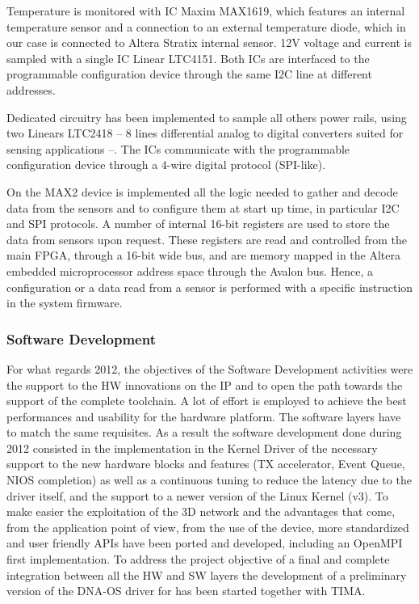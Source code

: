 Temperature is monitored with IC Maxim MAX1619, which features an
internal temperature sensor and a connection to an external temperature
diode, which in our case is connected to Altera Stratix internal sensor.
12V voltage and current is sampled with a single IC Linear LTC4151. 
Both ICs are interfaced to the programmable configuration device 
through the same I2C line at different addresses.

Dedicated circuitry has been implemented to sample all others power
rails, using two Linears LTC2418 -- 8 lines differential analog
to digital converters suited for sensing applications --. The ICs
communicate with the programmable configuration device through a
4-wire digital protocol (SPI-like).

On the MAX2 device is implemented all the logic needed to gather and
decode data from the sensors and to configure them at start up time,
in particular I2C and SPI protocols. A number of internal 16-bit
registers are used to store the data from sensors upon request. These
registers are read and controlled from the main FPGA, through a 16-bit
wide bus, and are memory mapped in the Altera \nios embedded
microprocessor address space through the Avalon bus. Hence, a
configuration or a data read from a sensor is performed with a
specific \nios instruction in the system firmware.


\subsubsection{Software Development}
\label{sec:swstack}
For what regards 2012, the objectives of the Software Development
activities were the support to the HW innovations on the \apenetp IP
and to open the path towards the support of the \euretile complete
toolchain. A lot of effort is employed to achieve the best
performances and usability for the hardware platform. The software
layers have to match the same requisites. As a result the software
development done during 2012 consisted in the implementation in the
\apenetp Kernel Driver of the necessary support to the new hardware
blocks and features (TX accelerator, Event Queue, NIOS completion) as
well as a continuous tuning to reduce the latency due to the driver
itself, and the support to a newer version of the Linux Kernel
(v3). To make easier the exploitation of the 3D network and the
advantages that come, from the application point of view, from the use
of the \apenetp device, more standardized and user friendly APIs have
been ported and developed, including an OpenMPI first
implementation. To address the project objective of a final and
complete integration between all the \euretile HW and SW layers the
development of a preliminary version of the DNA-OS driver for \apenetp
has been started together with TIMA.

